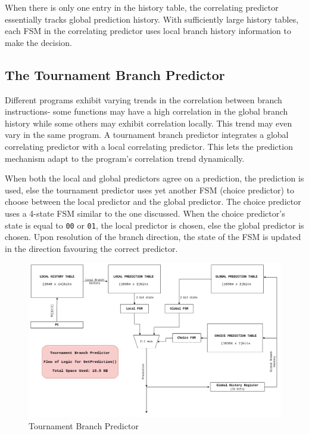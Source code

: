 \documentclass[12pt,a4paper,english]{paper}
\begin{document}
When there is only one entry in the history table, the correlating predictor essentially tracks global prediction history. With sufficiently large history tables, each FSM in the correlating predictor uses local branch history information to make the decision.

\subsection{The Tournament Branch Predictor \cite{mcfarling_combining_1993}}
Different programs exhibit varying trends in the correlation between branch instructions- some functions may have a high correlation in the global branch history while some others may exhibit correlation locally. This trend may even vary in the same program. A tournament branch predictor integrates a global correlating predictor with a local correlating predictor. This lets the prediction mechanism adapt to the program's correlation trend dynamically.

When both the local and global predictors agree on a prediction, the prediction is used, else the tournament predictor uses yet another FSM (choice predictor) to choose between the local predictor and the global predictor. The choice predictor uses a 4-state FSM similar to the one discussed. When the choice predictor's state is equal to \texttt{00} or \texttt{01}, the local predictor is chosen, else the global predictor is chosen. Upon resolution of the branch direction, the state of the FSM is updated in the direction favouring the correct predictor.
\begin{figure}[H]
    \centering
    \includegraphics[scale=0.35]{TourBP.png}
    \caption{Tournament Branch Predictor}
\end{figure}
\end{document}
